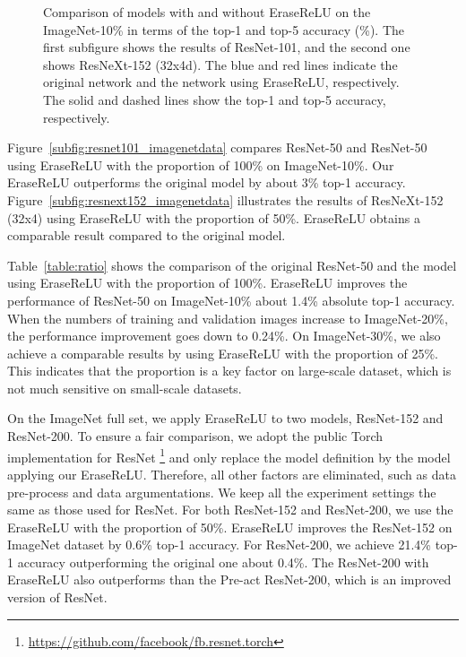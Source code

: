 \documentclass[10pt,twocolumn,letterpaper]{article}
\begin{document}
\begin{figure}[!t]
\center
{}
\caption{Comparison of models with and without EraseReLU on the ImageNet-10\% in terms of the top-1 and top-5 accuracy (\%). The first subfigure shows the results of ResNet-101, and the second one shows ResNeXt-152 (32x4d). The blue and red lines indicate the original network and the network using EraseReLU, respectively. The solid and dashed lines show the top-1 and top-5 accuracy, respectively.
}
\label{fig:imagenet_subdata}
\end{figure}

Figure~\ref{subfig:resnet101_imagenetdata} compares ResNet-50 and ResNet-50 using EraseReLU with the proportion of 100\% on ImageNet-10\%.
Our EraseReLU outperforms the original model by about 3\% top-1 accuracy.
Figure~\ref{subfig:resnext152_imagenetdata} illustrates the results of ResNeXt-152 (32x4) using EraseReLU with the proportion of 50\%.
EraseReLU obtains a comparable  result compared to the original model.



Table~\ref{table:ratio} shows the comparison of the original ResNet-50 and the model using EraseReLU with the proportion of 100\%.
EraseReLU improves the performance of ResNet-50 on ImageNet-10\% about 1.4\% absolute top-1 accuracy.
When the numbers of training and validation images increase to ImageNet-20\%, the performance improvement goes down to 0.24\%.
On ImageNet-30\%, we also achieve a comparable results by using EraseReLU with the proportion of 25\%.
This indicates that the proportion is a key factor on large-scale dataset, which is not much sensitive on small-scale datasets.


On the ImageNet full set, we apply EraseReLU to two models, ResNet-152 and ResNet-200. To ensure a fair comparison, we adopt the public Torch implementation for ResNet \footnote{\url{https://github.com/facebook/fb.resnet.torch}} and only replace the model definition by the model applying our EraseReLU.
Therefore, all other factors are eliminated, such as data pre-process and data argumentations. We keep all the experiment settings the same as those used for ResNet.
For both ResNet-152 and ResNet-200, we use the EraseReLU with the proportion of 50\%.
EraseReLU improves the ResNet-152 on ImageNet dataset by 0.6\% top-1 accuracy.
For ResNet-200, we achieve 21.4\% top-1 accuracy outperforming the original one about 0.4\%. The ResNet-200 with EraseReLU also outperforms than the Pre-act ResNet-200, which is an improved version of ResNet.
\end{document}
